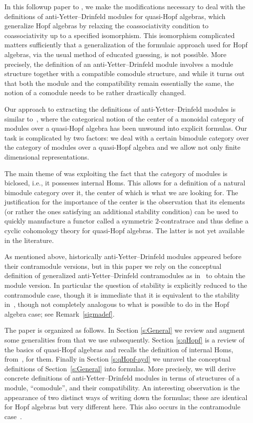 \documentclass[pdftex]{sigma}
\numberwithin{equation}{section}
\begin{document}
In this followup paper to \cite{sk}, we make the modifications necessary to deal with the definitions of anti-Yetter--Drinfeld modules for quasi-Hopf algebras, which generalize Hopf algebras by relaxing the coassociativity condition to coassociativity up to a specified isomorphism. This isomorphism complicated matters sufficiently that a generalization of the formulaic approach used for Hopf algebras, via the usual method of educated guessing, is not possible. More precisely, the definition of an anti-Yetter--Drinfeld module involves a module structure together with a compatible comodule structure, and while it turns out that both the module and the compatibility remain essentially the same, the notion of a comodule needs to be rather drastically changed.

Our approach to extracting the definitions of anti-Yetter--Drinfeld modules is similar to~\cite{majid}, where the categorical notion of the center of a monoidal category of modules over a quasi-Hopf algebra has been unwound into explicit formulas. Our task is complicated by two factors: we deal with a certain bimodule category over the category of modules over a quasi-Hopf algebra and we allow not only finite dimensional representations.

The main theme of \cite{sk} was exploiting the fact that the category of modules is biclosed, i.e., it possesses internal Homs. This allows for a definition of a natural bimodule category over it, the center of which is what we are looking for. The justification for the importance of the center is the observation that its elements (or rather the ones satisfying an additional stability condition) can be used to quickly manufacture a functor called a symmetric $2$-contratrace \cite{hks} and thus define a cyclic cohomology theory for quasi-Hopf algebras. The latter is not yet available in the literature.

As mentioned above, historically anti-Yetter--Drinfeld modules appeared before their contramodule versions, but in this paper we rely on the conceptual definition of generalized anti-Yetter--Drinfeld contramodules as in~\cite{sk} to obtain the module version. In particular the question of stability is explicitly reduced to the contramodule case, though it is immediate that it is equivalent to the stability in~\cite{hks}, though not completely analogous to what is possible to do in the Hopf algebra case; see Remark~\ref{sigmadef}.

The paper is organized as follows. In Section \ref{s:General} we review and augment some generalities from \cite{sk} that we use subsequently. Section \ref{s:qHopf} is a review of the basics of quasi-Hopf algebras and recalls the definition of internal Homs, from~\cite{sk}, for them. Finally in Section \ref{s:qHopf-ayd} we unravel the conceptual definitions of Section~\ref{s:General} into formulas. More precisely, we will derive concrete definitions of anti-Yetter--Drinfeld modules in terms of structures of a module, ``comodule'', and their compatibility. An interesting observation is the appearance of two distinct ways of writing down the formulas; these are identical for Hopf algebras but very different here. This also occurs in the contramodule case~\cite{sk}.
\end{document}
